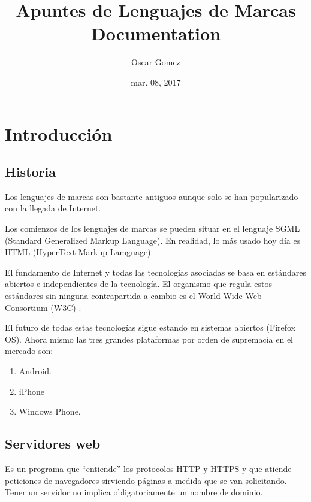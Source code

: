 \documentclass[letterpaper,10pt,spanish]{sphinxmanual}
\title{Apuntes de Lenguajes de Marcas Documentation}
\date{mar. 08, 2017}
\author{Oscar Gomez}
\begin{document}
\maketitle
\tableofcontents
{}\label{index::doc}



\chapter{Introducción}
\label{tema1::doc}\label{tema1:apuntes-de-lenguajes-de-marcas}\label{tema1:introduccion}

\section{Historia}
\label{tema1:historia}
Los lenguajes de marcas son bastante antiguos aunque solo se han popularizado con la llegada de Internet.

Los comienzos de los lenguajes de marcas se pueden situar en el lenguaje SGML (Standard Generalized Markup Language). En realidad, lo más usado hoy día es HTML (HyperText Markup Lamguage)

El fundamento de Internet y todas las tecnologías asociadas se basa en estándares abiertos e
independientes de la tecnología. El organismo que regula estos estándares sin ninguna contrapartida a cambio es el \href{http://www.w3c.org}{World Wide Web Consortium (W3C)} .

El futuro de todas estas tecnologías sigue estando en sistemas abiertos (Firefox OS). Ahora mismo las tres grandes plataformas por orden de supremacía en el mercado son:
\begin{enumerate}
\item {} 
Android.

\item {} 
iPhone

\item {} 
Windows Phone.

\end{enumerate}


\section{Servidores web}
\label{tema1:servidores-web}
Es un programa que “entiende” los protocolos HTTP y HTTPS y que atiende peticiones de navegadores
sirviendo páginas a medida que se van solicitando. Tener un servidor no implica obligatoriamente un nombre de dominio.
\end{document}
